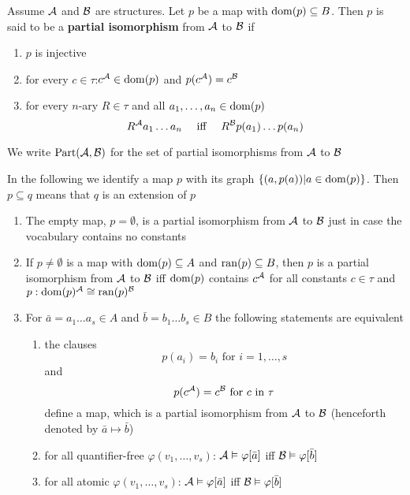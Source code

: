 \documentclass[11pt]{article}
\def \Part {\text{Part}}
\begin{document}
\begin{definition}[]
Assume \(\mathcal{A}\) and \(\mathcal{B}\) are structures. Let \(p\) be a map with
\(\operatorname{dom}(p)\subseteq B\). Then \(p\) is said to be a \textbf{partial isomorphism} from \(\mathcal{A}\)
to \(\mathcal{B}\) if
\begin{enumerate}
\item \(p\) is injective
\item for every \(c\in\tau\):\(c^{\mathcal{A}}\in\operatorname{dom}(p)\) and \(p(c^{\mathcal{A}})=c^{\mathcal{B}}\)
\item for every \(n\)-ary \(R\in\tau\) and all \(a_1,\dots,a_n\in\operatorname{dom}(p)\)
\begin{equation*}
R^{\mathcal{A}}a_1\dots a_n \quad\text{ iff }\quad
R^{\mathcal{B}}p(a_1)\dots p(a_n)
\end{equation*}
\end{enumerate}

We write \(\Part(\cala,\calb)\) for the set of partial isomorphisms from \(\mathcal{A}\) to \(\mathcal{B}\)
\end{definition}

In the following we identify a map \(p\) with its graph \(\{(a,p(a))|a\in\operatorname{dom}(p)\}\).
Then \(p\subseteq q\) means that \(q\) is an extension of \(p\)

\begin{remark}
\begin{enumerate}
\item The empty map, \(p=\emptyset\), is a partial isomorphism from \(\mathcal{A}\) to \(\mathcal{B}\) just in
case the vocabulary contains no constants
\item If \(p\neq\emptyset\) is a map with \(\operatorname{dom}(p)\subseteq A\) and \(\operatorname{ran}(p)\subseteq B\),
then \(p\) is a partial isomorphism from \(\mathcal{A}\) to \(\mathcal{B}\) iff \(\operatorname{dom}(p)\)
contains \(c^{\mathcal{A}}\) for all constants \(c\in\tau\) and \(p:\operatorname{dom}(p)^{\mathcal{A}}\cong\operatorname{ran}(p)^{\mathcal{B}}\)
\item For \(\bar{a}=a_1\dots a_s\in A\) and \(\bar{b}=b_1\dots b_s\in B\) the following statements
are equivalent
\begin{enumerate}
\item the clauses
\begin{equation*}
p(a_i)=b_i\text{ for }i=1,\dots,s
\end{equation*}
and
\begin{equation*}
p(c^{\mathcal{A}})=c^{\mathcal{B}}\text{ for }c\text{ in }\tau
\end{equation*}
define a map, which is a partial isomorphism from \(\mathcal{A}\) to \(\mathcal{B}\) (henceforth
denoted by \(\bar{a}\mapsto\bar{b}\))
\item for all quantifier-free \(\varphi(v_1,\dots,v_s)\):
\(\mathcal{A}\vDash\varphi[\bar{a}]\) iff
\(\mathcal{B}\vDash\varphi[\bar{b}]\)
\item for all atomic \(\varphi(v_1,\dots,v_s)\):
\(\mathcal{A}\vDash\varphi[\bar{a}]\) iff
\(\mathcal{B}\vDash\varphi[\bar{b}]\)
\end{enumerate}
\end{enumerate}
\end{remark}
\end{document}
